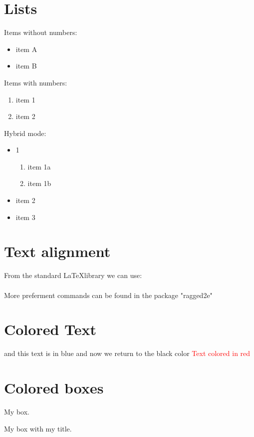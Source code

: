 \section{Lists}
Items without numbers:
\begin{itemize}
	\item item A
	\item item B
\end{itemize}
Items with numbers:
\begin{enumerate}
	\item item 1
	\item item 2
\end{enumerate}
Hybrid mode:
\begin{itemize}
	\item 1
	\begin{enumerate}
		\item item 1a
		\item item 1b
	\end{enumerate}
	\item item 2
	\item item 3
\end{itemize}
\section{Text alignment}
From the standard \LaTeX library we can use:
\\
\\
More preferment commands can be  found in the package "ragged2e"

\section{Colored Text}
\color{blue}
and this  text is in blue
\color{black}
and now we return to the black color
\textcolor{red}{Text colored in red}

\section{Colored boxes}
\begin{tcolorbox}[colback=blue!5!white,colframe=blue!75!black]
	My box.
\end{tcolorbox}

\begin{tcolorbox}[colback=blue!5!white,colframe=blue!75!black,title=My title]
	My box with my title.
\end{tcolorbox}

